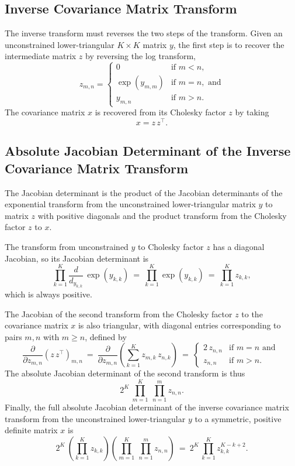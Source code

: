 \documentclass[10pt]{report}
\begin{document}
\subsection{Inverse Covariance Matrix Transform}

The inverse transform must reverses the two steps of the transform.
Given an unconstrained lower-triangular $K \times K$ matrix $y$, the
first step is to recover the intermediate matrix $z$ by reversing the
log transform,
\[
z_{m,n} = 
\left\{
\begin{array}{cl}
0 & \mbox{if } m < n,
\\[4pt]
\exp(y_{m,m}) & \mbox{if } m = n, \mbox{ and}
\\[4pt]
y_{m,n} & \mbox{if } m > n.
\end{array}
\right.
\]
%
The covariance matrix $x$ is recovered from its Cholesky factor $z$ by
taking
%
\[
x = z \, z^{\top}.
\]

\subsection{Absolute Jacobian Determinant of the Inverse Covariance
  Matrix Transform}

The Jacobian determinant is the product of the Jacobian determinants
of the exponential transform from the unconstrained lower-triangular
matrix $y$ to matrix $z$ with positive diagonals and the product
transform from the Cholesky factor $z$ to $x$.

The transform from unconstrained $y$ to Cholesky factor $z$ has a
diagonal Jacobian, so its Jacobian determinant is
%
\[
\prod_{k=1}^K  \frac{d}{d_{y_{k,k}}} \, \exp(y_{k,k})
\ = \ 
\prod_{k=1}^K \exp(y_{k,k})
\ = \
\prod_{k=1}^K z_{k,k},
\]
which is always positive.

The Jacobian of the second transform from the Cholesky factor $z$ to
the covariance matrix $x$ is also triangular, with diagonal entries
corresponding to pairs $m,n$ with $m \geq n$, defined by
\[
\frac{\partial}{\partial z_{m,n}}
\left( z \, z^{\top} \right)_{m,n}
\ = \
\frac{\partial}{\partial z_{m,n}}
\left( \sum_{k=1}^K z_{m,k} \, z_{n,k} \right)
\ = \
\left\{
\begin{array}{cl}
2 \, z_{n,n} & \mbox{if } m = n \mbox{ and }
\\[4pt]
z_{n,n} & \mbox{if } m > n.
\end{array}
\right.
\]
%
The absolute Jacobian determinant of the second transform is thus
\[
2^{K} 
\
\prod_{m = 1}^{K} \ \prod_{n=1}^{m} z_{n,n}.
\]
Finally, the full absolute Jacobian determinant of the inverse
covariance matrix transform from the unconstrained lower-triangular 
$y$ to a symmetric, positive definite matrix $x$ is
\[
2^{K} 
\
\left( \prod_{k=1}^K z_{k,k} \right)
\left( \prod_{m = 1}^{K} \ \prod_{n=1}^{m} z_{n,n} \right)
\ = \
2^K
\, \prod_{k=1}^K z_{k,k}^{K-k+2}.
\]
\end{document}
